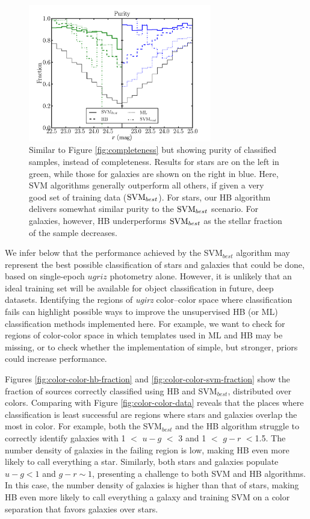 \documentclass[12pt,preprint]{aastex}
\begin{document}
\begin{figure}
\centering
 \includegraphics[clip=true, trim=0cm 0cm 0.0cm 0.cm,width=8cm]{fig4.pdf}
\caption{Similar to Figure \ref{fig:completeness} but showing purity
  of classified samples, instead of completeness. Results for stars
  are on the left in green, while those for galaxies are shown on the
  right in blue.  Here, SVM algorithms generally outperform all others,
  if given a very good set of training data (${\rm SVM}_{best}$).  For
  stars, our HB algorithm delivers somewhat similar purity to the ${\rm
    SVM}_{best}$ scenario.  For galaxies, however, HB underperforms ${\rm
    SVM}_{best}$ as the stellar fraction of the sample decreases.}
\label{fig:purity}
\end{figure}

We infer below that the performance achieved by the SVM$_{best}$
algorithm may represent the best possible classification of stars and
galaxies that could be done, based on single-epoch $ugriz$ photometry
alone.  However, it is unlikely that an ideal training set will be
available for object classification in future, deep datasets.
Identifying the regions of {\it ugirz} color--color space where
classification fails can highlight possible ways to improve the
unsupervised HB (or ML) classification methods implemented here.  For
example, we want to check for regions of color-color space in which
templates used in ML and HB may be missing, or to check whether the
implementation of simple, but stronger, priors could increase
performance.

Figures \ref{fig:color-color-hb-fraction} and
\ref{fig:color-color-svm-fraction} show the fraction of sources
correctly classified using HB and SVM$_{best}$, distributed over
colors.  Comparing with Figure \ref{fig:color-color-data} reveals that
the places where classification is least successful are regions where
stars and galaxies overlap the most in color.  For example, both the
SVM$_{best}$ and the HB algorithm struggle to correctly identify
galaxies with 1 $<$ $u-g$ $<$ 3 and 1 $<$ $g-r$ $<$1.5.  The number
density of galaxies in the failing region is low, making HB even more
likely to call everything a star.  Similarly, both stars and galaxies
populate $u-g < 1$ and $g-r \sim 1$, presenting a challenge to both
SVM and HB algorithms.  In this case, the number density of galaxies
is higher than that of stars, making HB even more likely to call
everything a galaxy and training SVM on a color separation that favors
galaxies over stars.
\end{document}
